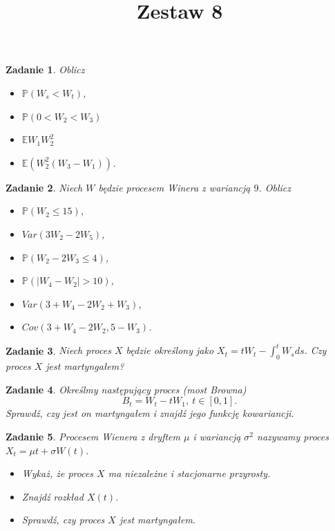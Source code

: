 \documentclass{mwart}
\title{Zestaw 8}
\newtheorem{zd}{Zadanie}
\begin{document}

\maketitle

\begin{zd}
	Oblicz
	\begin{itemize}
		\item $\mathbb{P}(W_s < W_t)$,
		\item $\mathbb{P}(0 < W_2 < W_3)$
		\item $\mathbb{E}W_1W_2^2$
		\item $\mathbb{E}\left(W_2^2(W_3 - W_1)\right)$.
	\end{itemize}
\end{zd}

\begin{zd}
Niech $W$ będzie procesem Winera z wariancją $9$. Oblicz
\begin{itemize}
\item $\mathbb{P}(W_2 \leq 15)$,
\item $Var(3W_2-2W_5)$,
\item $\mathbb{P}(W_2-2W_3\leq 4)$,
\item $\mathbb{P}(|W_4-W_2|> 10)$,
\item $Var(3+W_4-2W_2+W_3)$,
\item $Cov(3+W_4-2W_2, 5-W_3)$.
\end{itemize}
\end{zd}

\begin{zd}
Niech proces $X$ będzie określony jako $X_t = tW_t - \int_0^tW_sds$. Czy proces $X$ jest martyngałem?
\end{zd}

\begin{zd}
	Określmy następujący proces (most Browna)
	\begin{displaymath}
		B_t = W_t - tW_1, \ t\in[0,1].
	\end{displaymath}
	Sprawdź, czy jest on martyngałem i znajdź jego funkcję kowariancji.
\end{zd}

\begin{zd}
Procesem Wienera z dryftem $\mu$ i wariancją $\sigma^2$ nazywamy proces $X_t = \mu t+ \sigma W(t)$.
\begin{itemize}
\item Wykaż, że proces $X$ ma niezależne i stacjonarne przyrosty.
\item Znajdź rozkład $X(t)$.
\item Sprawdź, czy proces $X$ jest martyngałem.
\end{itemize}
\end{zd}
\end{document}

